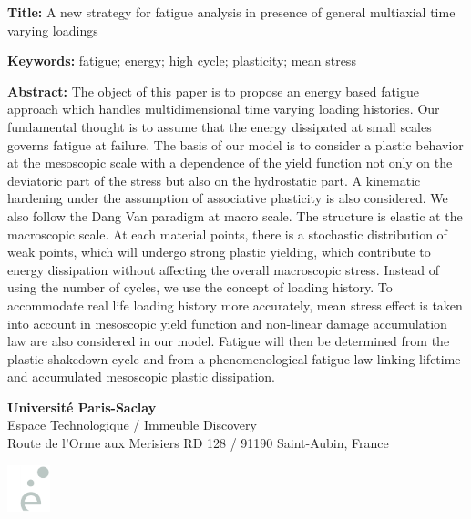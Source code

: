 \begin{flushleft}
\vspace{20pt}

\begin{mdframed}
\textbf{Title:} A new strategy for fatigue analysis in presence of general multiaxial time varying loadings

\textbf{Keywords:} fatigue; energy; high cycle; plasticity; mean stress

\textbf{Abstract:} The object of this paper is to propose an energy based fatigue approach which handles multidimensional time varying loading histories. Our fundamental thought is to assume that the energy dissipated at small scales governs fatigue at failure. The basis of our model is to consider a plastic behavior at the mesoscopic scale with a dependence of the yield function not only on the deviatoric part of the stress but also on the hydrostatic part. A kinematic hardening under the assumption of associative plasticity is also considered. We also follow the Dang Van paradigm at macro scale. The structure is elastic at the macroscopic scale. At each material points, there is a stochastic distribution of weak points, which will undergo strong plastic yielding, which contribute to energy dissipation without affecting the overall macroscopic stress. Instead of using the number of cycles, we use the concept of loading history. To accommodate real life loading history more accurately, mean stress effect is taken into account in mesoscopic yield function and non-linear damage accumulation law are also considered in our model. Fatigue will then be determined from the plastic shakedown cycle and from a phenomenological fatigue law linking lifetime and accumulated mesoscopic plastic dissipation.


\end{mdframed}
\end{flushleft}

\vfill

\begin{minipage}[b]{0.5\textwidth}
\small
\color{color02}
\textbf{Université Paris-Saclay} \\
Espace Technologique / Immeuble Discovery  \\
Route de l'Orme aux Merisiers RD 128 / 91190 Saint-Aubin, France
\end{minipage}
\hfill
\begin{minipage}[b]{0.35\textwidth}
\hfill
\includegraphics[width=35pt]{figures/SMEMAG2.png}
\end{minipage}